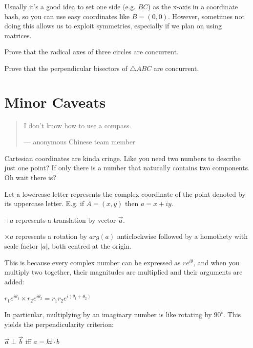 \documentclass[11pt]{scrartcl}
\begin{document}
\begin{remark}
  Usually it's a good idea to set one side (e.g. $BC$) as the x-axis in a coordinate bash, so you can use easy coordinates like $B=(0, 0)$. However, sometimes not doing this allows us to exploit symmetries, especially if we plan on using matrices.
\end{remark}
\begin{exercise}
  Prove that the radical axes of three circles are concurrent. 
\end{exercise}
\begin{exercise}
  Prove that the perpendicular bisectors of $\triangle ABC$ are concurrent.
\end{exercise}

\section{Minor Caveats}
\begin{abstract}
  \sffamily
  I don't know how to use a compass.
  \medskip
  
  --- anonymous Chinese team member
\end{abstract}
Cartesian coordinates are kinda cringe. Like you need two numbers to describe just one point? If only there is a number that naturally contains two components. Oh wait there is?
\begin{definition}
  Let a lowercase letter represents the complex coordinate of the point denoted by its uppercase letter. E.g. if $A=(x, y)$ then $a=x+iy$. 
\end{definition}
\begin{fact}
  $+a$
  represents a translation by vector $\vec{a}$.
\end{fact}
\begin{fact}
  $\times a$
  represents a rotation by $arg(a)$ anticlockwise followed by a homothety with scale factor $|a|$, both centred at the origin.
\end{fact}
This is because every complex number can be expressed as $re^{i\theta}$, and when you multiply two together, their magnitudes are multiplied and their arguments are added: 
\begin{center}
  $r_1e^{i\theta_1} \times r_2e^{i\theta_2} = r_1r_2e^{i(\theta_1+\theta_2)}$
\end{center}
In particular, multiplying by an imaginary number is like rotating by $90^{\circ}$. This yields the perpendicularity criterion:
\begin{center}
  $\vec{a} \perp \vec{b}$ iff $a = ki \cdot b$
\end{center}
\end{document}
